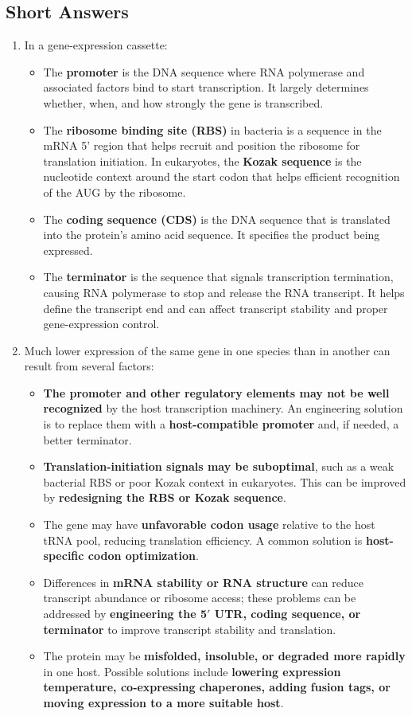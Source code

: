 \documentclass[12pt,a4paper]{article}
\begin{document}
\subsection{Short Answers}
\begin{enumerate}[parsep=0.5\baselineskip] 
  \item In a gene-expression cassette:
  \begin{itemize}
    \item The \textbf{promoter} is the DNA sequence where RNA polymerase and associated factors bind to start transcription. It largely determines whether, when, and how strongly the gene is transcribed.
    \item The \textbf{ribosome binding site (RBS)} in bacteria is a sequence in the mRNA 5' region that helps recruit and position the ribosome for translation initiation. In eukaryotes, the \textbf{Kozak sequence} is the nucleotide context around the start codon that helps efficient recognition of the AUG by the ribosome.
    \item The \textbf{coding sequence (CDS)} is the DNA sequence that is translated into the protein’s amino acid sequence. It specifies the product being expressed.
    \item The \textbf{terminator} is the sequence that signals transcription termination, causing RNA polymerase to stop and release the RNA transcript. It helps define the transcript end and can affect transcript stability and proper gene-expression control.
  \end{itemize}

  \item Much lower expression of the same gene in one species than in another can result from several factors:
  \begin{itemize}
    \item \textbf{The promoter and other regulatory elements may not be well recognized} by the host transcription machinery. An engineering solution is to replace them with a \textbf{host-compatible promoter} and, if needed, a better terminator. 
    \item \textbf{Translation-initiation signals may be suboptimal}, such as a weak bacterial RBS or poor Kozak context in eukaryotes. This can be improved by \textbf{redesigning the RBS or Kozak sequence}. 
    \item The gene may have \textbf{unfavorable codon usage} relative to the host tRNA pool, reducing translation efficiency. A common solution is \textbf{host-specific codon optimization}.
    \item Differences in \textbf{mRNA stability or RNA structure} can reduce transcript abundance or ribosome access; these problems can be addressed by \textbf{engineering the 5$'$ UTR, coding sequence, or terminator} to improve transcript stability and translation.
    \item The protein may be \textbf{misfolded, insoluble, or degraded more rapidly} in one host. Possible solutions include \textbf{lowering expression temperature, co-expressing chaperones, adding fusion tags, or moving expression to a more suitable host}.
  \end{itemize}


\end{enumerate}
\end{document}
